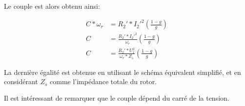 \documentclass[11pt]{article}
\begin{document}
    Le couple est alors obtenu ainsi:

\begin{align}
  C*\omega_r &= R_2' * I_2'^2 \left(\frac{1-g}{g}\right) \\
  C &= \frac{R_2' * I_2'^2}{\omega_r} \left(\frac{1-g}{g}\right) \\
  C &= \frac{R_2' * U_1^2}{\omega_r * Z_s} \left(\frac{1-g}{g}\right)
\end{align}

    La dernière égalité est obtenue en utilisant le schéma équivalent
simplifié, et en considérant \(Z_s\) comme l'impédance totale du rotor.

    Il est intéressant de remarquer que le couple dépend du carré de la
tension.


    
    
    
\end{document}
